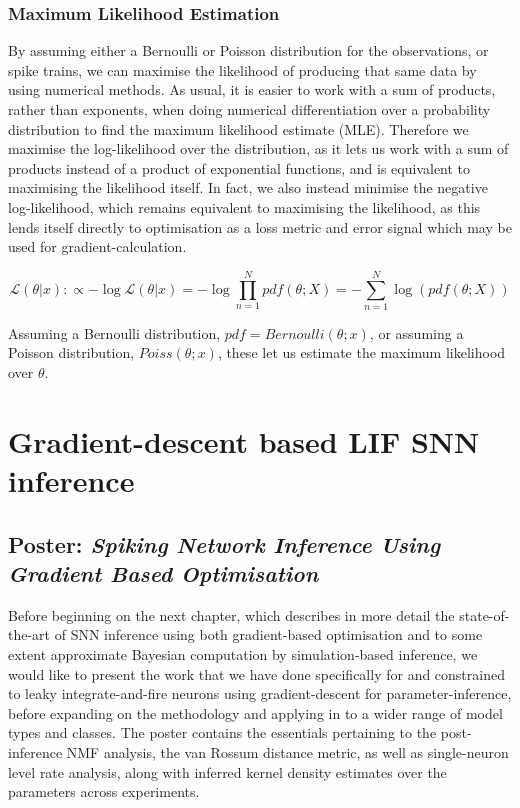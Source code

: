 \documentclass[mphil,deptreport,ianc]{infthesis} %
\begin{document}
\subsection{Maximum Likelihood Estimation}

By assuming either a Bernoulli or Poisson distribution for the observations, or spike trains, we can maximise the likelihood of producing that same data by using numerical methods.
As usual, it is easier to work with a sum of products, rather than exponents, when doing numerical differentiation over a probability distribution to find the maximum likelihood estimate (MLE).
Therefore we maximise the log-likelihood over the distribution, as it lets us work with a sum of products instead of a product of exponential functions, and is equivalent to maximising the likelihood itself.
In fact, we also instead minimise the negative log-likelihood, which remains equivalent to maximising the likelihood, as this lends itself directly to optimisation as a loss metric and error signal which may be used for gradient-calculation.

\begin{equation}
    \mathcal{L}(\theta | x) :\propto - \log \mathcal{L}(\theta | x) = - \log \prod_{n=1}^N pdf(\theta; X) = - \sum_{n=1}^N \log (pdf(\theta; X))
\end{equation}

Assuming a Bernoulli distribution, $pdf=Bernoulli(\theta; x)$, or assuming a Poisson distribution, $Poiss(\theta; x)$, these let us estimate the maximum likelihood over $\theta$.


\chapter{Gradient-descent based LIF SNN inference}\label{chpt:LIF}

\section{Poster: \textit{Spiking Network Inference Using Gradient Based Optimisation}}

Before beginning on the next chapter, which describes in more detail the state-of-the-art of SNN inference using both gradient-based optimisation and to some extent approximate Bayesian computation by simulation-based inference, we would like to present the work that we have done specifically for and constrained to leaky integrate-and-fire neurons using gradient-descent for parameter-inference, before expanding on the methodology and applying in to a wider range of model types and classes.
The poster contains the essentials pertaining to the post-inference NMF analysis, the van Rossum distance metric, as well as single-neuron level rate analysis, along with inferred kernel density estimates over the parameters across experiments.
\end{document}
